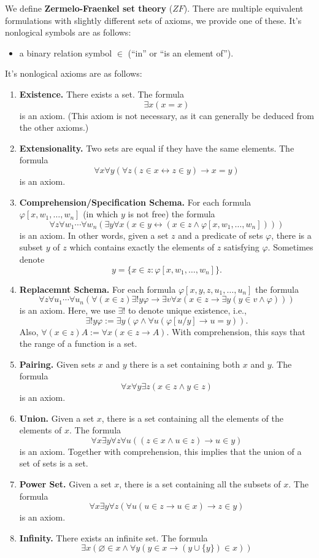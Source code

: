 \documentclass[12pt]{article}
\theoremstyle{definition}
\renewcommand{\phi}{\varphi}
\renewcommand{\emptyset}{\varnothing}
\newcommand{\<}{\langle}
\renewcommand{\>}{\rangle}
\newcommand{\keyword}{\textbf}
\newcommand{\liff}{\leftrightarrow}
\begin{document}
We define \keyword{Zermelo-Fraenkel set theory} ($ZF$).
There are multiple equivalent formulations with slightly different sets of axioms, we provide one of these.
It's nonlogical symbols are as follows:
\begin{itemize}
    \item a binary relation symbol $\in$ (``in'' or ``is an element of'').
\end{itemize}
It's nonlogical axioms are as follows:
\begin{enumerate}[(1)]
    \item \keyword{Existence.} There exists a set.
    The formula
    \[
        \exists x (x = x)
    \]
    is an axiom.
    (This axiom is not necessary, as it can generally be deduced from the other axioms.)
    \item \keyword{Extensionality.} Two sets are equal if they have the same elements.
    The formula
    \[
        \forall x \forall y (\forall z (z \in x \liff z \in y) \to x = y)
    \]
    is an axiom.
    \item \keyword{Comprehension/Specification Schema.} For each formula $\phi[x, w_1, \dots, w_n]$ (in which $y$ is not free) the formula
    \[
        \forall z \forall w_1 \cdots \forall w_n (\exists y \forall x (x \in y \liff (x \in z \land \phi[x, w_1, \dots, w_n])))
    \]
    is an axiom.
    In other words, given a set $z$ and a predicate of sets $\phi$, there is a subset $y$ of $z$ which contains exactly the elements of $z$ satisfying $\phi$.
    Sometimes denote
    \[
        y = \{x \in z : \phi[x, w_1, \dots, w_n]\}.
    \]
    \item \keyword{Replacemnt Schema.} For each formula $\phi[x, y, z, u_1, \dots, u_n]$ the formula
    \[
        \forall z \forall u_1 \cdots \forall u_n (\forall(x \in z)\exists! y\phi \to \exists v \forall x (x \in z \to \exists y (y \in v \land \phi)))
    \]
    is an axiom.
    Here, we use $\exists!$ to denote unique existence, i.e.,
    \[
        \exists! y \phi := \exists y (\phi \land \forall u (\phi[u/y] \to u = y)).
    \]
    Also, $\forall(x \in z)A := \forall x (x \in z \to A)$.
    With comprehension, this says that the range of a function is a set.
    \item \keyword{Pairing.} Given sets $x$ and $y$ there is a set containing both $x$ and $y$. The formula
    \[
        \forall x \forall y \exists z (x \in z \land y \in z)
    \]
    is an axiom.
    \item \keyword{Union.} Given a set $x$, there is a set containing all the elements of the elements of $x$.
    The formula
    \[
        \forall x \exists y \forall z \forall u ((z \in x \land u \in z) \to u \in y)
    \]
    is an axiom.
    Together with comprehension, this implies that the union of a set of sets is a set.
    \item \keyword{Power Set.} Given a set $x$, there is a set containing all the subsets of $x$.
    The formula
    \[
        \forall x \exists y \forall z (\forall u (u \in z \to u \in x) \to z \in y)
    \]
    is an axiom.
    \item \keyword{Infinity.} There exists an infinite set.
    The formula
    \[
        \exists x (\emptyset \in x \land \forall y (y \in x \to (y \cup \{y\}) \in x))
    \]


\end{enumerate}
\end{document}
